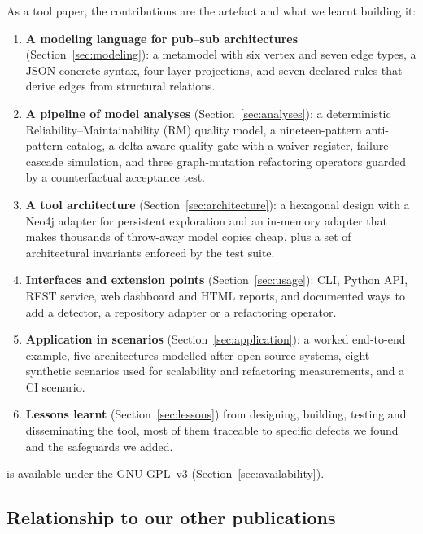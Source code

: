 As a tool paper, the contributions are the artefact and what we learnt building it:
\begin{enumerate}\tightlist
  \item \textbf{A modeling language for pub--sub architectures} (Section~\ref{sec:modeling}): a metamodel with six vertex and seven edge types, a JSON concrete syntax, four layer projections, and seven declared rules that derive  edges from structural relations.
  \item \textbf{A pipeline of model analyses} (Section~\ref{sec:analyses}): a deterministic Reliability--Maintainability (RM) quality model, a nineteen-pattern anti-pattern catalog, a delta-aware quality gate with a waiver register, failure-cascade simulation, and three graph-mutation refactoring operators guarded by a counterfactual acceptance test.
  \item \textbf{A tool architecture} (Section~\ref{sec:architecture}): a hexagonal design with a Neo4j adapter for persistent exploration and an in-memory adapter that makes thousands of throw-away model copies cheap, plus a set of architectural invariants enforced by the test suite.
  \item \textbf{Interfaces and extension points} (Section~\ref{sec:usage}): CLI, Python API, REST service, web dashboard and HTML reports, and documented ways to add a detector, a repository adapter or a refactoring operator.
  \item \textbf{Application in scenarios} (Section~\ref{sec:application}): a worked end-to-end example, five architectures modelled after open-source systems, eight synthetic scenarios used for scalability and refactoring measurements, and a CI scenario.
  \item \textbf{Lessons learnt} (Section~\ref{sec:lessons}) from designing, building, testing and disseminating the tool, most of them traceable to specific defects we found and the safeguards we added.
\end{enumerate}
\sag{} is available under the GNU GPL~v3 (Section~\ref{sec:availability}).

\subsection{Relationship to our other publications}
\label{sec:intro:prior}


